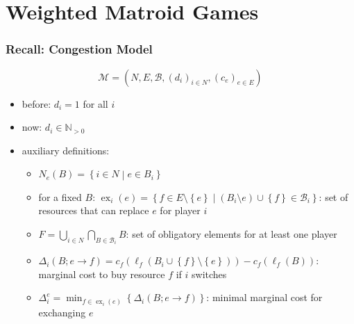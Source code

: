 \documentclass{beamer}
\newcommand{\tupel}[1]{\left(#1\right)}
\newcommand{\set}[1]{\left\{#1\right\}}
\DeclareMathOperator{\ex}{ex}
\begin{document}
\section{Weighted Matroid Games}
\begin{frame}
  \frametitle{Recall: Congestion Model}
  \begin{equation*}
    \mathcal{M} = \tupel{N, E, \mathcal{B}, \left(d_{i}\right)_{i\in N},
    \left(c_{e}\right)_{e\in E}}
  \end{equation*}
  \vspace{-1cm}
  \begin{itemize}
    \item before: $d_{i} = 1$ for all $i$
    \item now: $d_{i}\in\mathbb{N}_{>0}$ 
    \item auxiliary definitions:
      \begin{itemize}
        \item $N_{e}\tupel{B} = \set{i\in N\middle|e\in B_{i}}$
        \item for a fixed $B$: $\ex_{i}\tupel{e} =
          \set{f\in E\setminus\set{e}\middle|
          (B_{i}\setminus{e})\cup\set{f}\in\mathcal{B}_{i}}$: set of resources
          that can replace $e$ for player $i$
        \item $F = \bigcup_{i\in N}\bigcap_{B\in \mathcal{B}_{i}} B$:
          set of obligatory elements for at least one player
        \item $\Delta_{i}\tupel{B;e\rightarrow f} =
          c_{f}\tupel{\ell_{f}\tupel{B_{i}\cup\set{f}\setminus\set{e}}} -
          c_{f}\tupel{\ell_{f}\tupel{B}}$: marginal cost to buy resource $f$ if
          $i$ switches
        \item $\Delta_{i}^{e} = \min_{f\in\ex_{i}(e)}\set{\Delta_{i}(B;e\rightarrow f)}$:
          minimal marginal cost for exchanging $e$
      \end{itemize}
  \end{itemize}
\end{frame}
\end{document}
